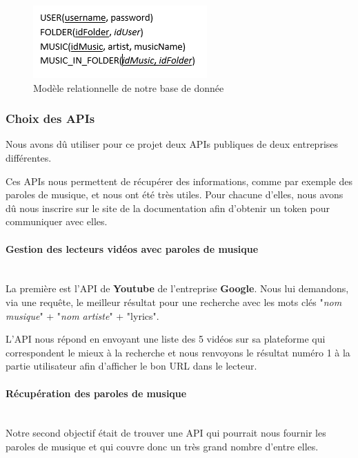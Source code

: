 \documentclass[12pt,french]{article}
\begin{document}
\begin{figure}[H]
	\centering
	\includegraphics[scale=1]{table.png}
	\caption{Modèle relationnelle de notre base de donnée}    
\end{figure}


\subsubsection{Choix des APIs}

Nous avons dû utiliser pour ce projet deux \gls{API}s publiques de deux entreprises différentes.

\medskip

Ces \gls{API}s nous permettent de récupérer des informations, comme par exemple des paroles de musique, et nous ont été très utiles. Pour chacune d'elles, nous avons dû nous inscrire sur le site de la documentation afin d'obtenir un token pour communiquer avec elles.

\paragraph{Gestion des lecteurs vidéos avec paroles de musique \\\\}

La première est l'\gls{API} de \textbf{Youtube} de l'entreprise \textbf{Google}. Nous lui demandons, via une requête, le meilleur résultat pour une recherche avec les mots clés "\textit{nom musique}" + "\textit{nom artiste}" + "lyrics".

L'\gls{API} nous répond en envoyant une liste des 5 vidéos sur sa plateforme qui correspondent le mieux à la recherche et nous renvoyons le résultat numéro 1 à la partie utilisateur afin d'afficher le bon URL dans le lecteur.

\paragraph{Récupération des paroles de musique \\\\}

Notre second objectif était de trouver une \gls{API} qui pourrait nous fournir les paroles de musique et qui couvre donc un très grand nombre d'entre elles.
\end{document}
